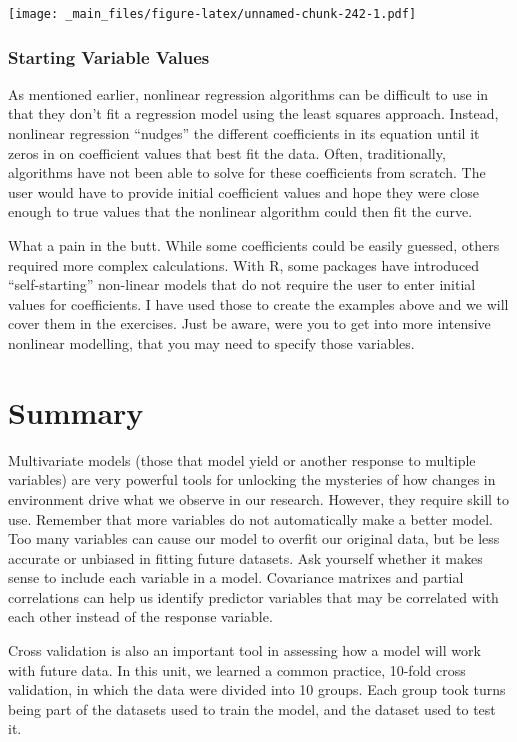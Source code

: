 \documentclass[
]{book}
\begin{document}
\texttt{[image: \_main\_files/figure-latex/unnamed-chunk-242-1.pdf]}

\hypertarget{starting-variable-values}{%
\subsubsection{Starting Variable Values}\label{starting-variable-values}}

As mentioned earlier, nonlinear regression algorithms can be difficult to use in that they don't fit a regression model using the least squares approach. Instead, nonlinear regression ``nudges'' the different coefficients in its equation until it zeros in on coefficient values that best fit the data. Often, traditionally, algorithms have not been able to solve for these coefficients from scratch. The user would have to provide initial coefficient values and hope they were close enough to true values that the nonlinear algorithm could then fit the curve.

What a pain in the butt. While some coefficients could be easily guessed, others required more complex calculations. With R, some packages have introduced ``self-starting'' non-linear models that do not require the user to enter initial values for coefficients. I have used those to create the examples above and we will cover them in the exercises. Just be aware, were you to get into more intensive nonlinear modelling, that you may need to specify those variables.

\hypertarget{summary-1}{%
\section{Summary}\label{summary-1}}

Multivariate models (those that model yield or another response to multiple variables) are very powerful tools for unlocking the mysteries of how changes in environment drive what we observe in our research. However, they require skill to use. Remember that more variables do not automatically make a better model. Too many variables can cause our model to overfit our original data, but be less accurate or unbiased in fitting future datasets. Ask yourself whether it makes sense to include each variable in a model. Covariance matrixes and partial correlations can help us identify predictor variables that may be correlated with each other instead of the response variable.

Cross validation is also an important tool in assessing how a model will work with future data. In this unit, we learned a common practice, 10-fold cross validation, in which the data were divided into 10 groups. Each group took turns being part of the datasets used to train the model, and the dataset used to test it.
\end{document}
